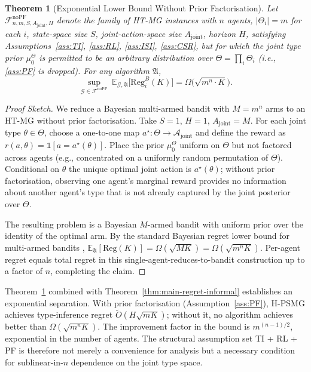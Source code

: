 \documentclass{article}
\newtheorem{theorem}{Theorem}[section]
\begin{document}
\begin{theorem}[Exponential Lower Bound Without Prior Factorisation]
\label{thm:lower-no-pf}
Let $\mathcal{F}^{\mathrm{noPF}}_{n, m, S, A_{\mathrm{joint}}, H}$ denote the family of HT-MG instances with $n$ agents, $|\Theta_i| = m$ for each $i$, state-space size $S$, joint-action-space size $A_{\mathrm{joint}}$, horizon $H$, satisfying Assumptions~\ref{ass:TI}, \ref{ass:RL}, \ref{ass:ISI}, \ref{ass:CSR}, but for which the joint type prior $\mu_0^\Theta$ is permitted to be an arbitrary distribution over $\Theta = \prod_i \Theta_i$ (i.e., \ref{ass:PF} is dropped). For any algorithm $\mathfrak{A}$,
\begin{equation}
\sup_{\mathcal{G} \in \mathcal{F}^{\mathrm{noPF}}}\ \mathbb{E}_{\mathcal{G}, \mathfrak{A}}\big[\mathrm{Reg}_i^B(K)\big] = \Omega\big(\sqrt{m^n \cdot K}\big).
\end{equation}
\end{theorem}

\begin{proof}[Proof Sketch]
We reduce a Bayesian multi-armed bandit with $M = m^n$ arms to an HT-MG without prior factorisation. Take $S = 1$, $H = 1$, $A_{\mathrm{joint}} = M$. For each joint type $\theta \in \Theta$, choose a one-to-one map $a^\star \colon \Theta \to \mathcal{A}_{\mathrm{joint}}$ and define the reward as $r(a, \theta) = \mathbb{1}[a = a^\star(\theta)]$. Place the prior $\mu_0^\Theta$ uniform on $\Theta$ but not factored across agents (e.g., concentrated on a uniformly random permutation of $\Theta$). Conditional on $\theta$ the unique optimal joint action is $a^\star(\theta)$; without prior factorisation, observing one agent's marginal reward provides no information about another agent's type that is not already captured by the joint posterior over $\Theta$.

The resulting problem is a Bayesian $M$-armed bandit with uniform prior over the identity of the optimal arm. By the standard Bayesian regret lower bound for multi-armed bandits \citep[Theorem 15.2]{lattimore2020bandit},
$\mathbb{E}_{\mathfrak{A}}[\mathrm{Reg}(K)] = \Omega(\sqrt{MK}) = \Omega(\sqrt{m^n K})$.
Per-agent regret equals total regret in this single-agent-reduces-to-bandit construction up to a factor of $n$, completing the claim.
\end{proof}

Theorem~\ref{thm:lower-no-pf} combined with Theorem~\ref{thm:main-regret-informal} establishes an exponential separation. With prior factorisation (Assumption~\ref{ass:PF}), H-PSMG achieves type-inference regret $\tilde O(H\sqrt{m K})$; without it, no algorithm achieves better than $\Omega(\sqrt{m^n K})$. The improvement factor in the bound is $m^{(n-1)/2}$, exponential in the number of agents. The structural assumption set TI + RL + PF is therefore not merely a convenience for analysis but a necessary condition for sublinear-in-$n$ dependence on the joint type space.
\end{document}
